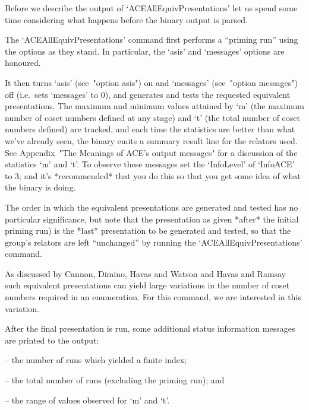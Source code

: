 Before we describe the {\GAP} output of `ACEAllEquivPresentations' let
us spend some time considering what happens before the  {\ACE}  binary
output is parsed.

The `ACEAllEquivPresentations'  command  first  performs  a  ``priming
run'' using the options as they stand. In particular, the  `asis'  and
`messages' options are honoured.

It  then  turns  `asis'  (see~"option   asis")   on   and   `messages'
(see~"option messages") off (i.e.~sets `messages' to 0), and generates
and tests the requested  equivalent  presentations.  The  maximum  and
minimum values attained by `m' (the maximum number  of  coset  numbers
defined at any stage) and `t'  (the  total  number  of  coset  numbers
defined) are tracked, and each time the  statistics  are  better  than
what we've already seen, the {\ACE} binary emits a summary result line
for the relators used. See  Appendix~"The  Meanings  of  ACE's  output
messages" for a discussion of the statistics `m' and `t'.  To  observe
these messages set  the  `InfoLevel'  of  `InfoACE'  to  3;  and  it's
*recommended* that you do this so that you get some idea of  what  the
{\ACE} binary is doing.

The order in which the  equivalent  presentations  are  generated  and
tested has no particular significance, but note that the  presentation
as given *after* the initial priming run) is the  *last*  presentation
to be generated and tested, so that  the  group's  relators  are  left
``unchanged'' by running the `ACEAllEquivPresentations' command.

As discussed by Cannon, Dimino, Havas  and  Watson  \cite{CDHW73}  and
Havas and Ramsay \cite{HR01} such equivalent presentations  can  yield
large variations in  the  number  of  coset  numbers  required  in  an
enumeration. For this command, we are interested in this variation.

After  the  final  presentation  is  run,   some   additional   status
information messages are printed to the {\ACE} output:

\beginlist%

\item{--}  the number of runs which yielded a finite index; 

\item{--}  the total number of runs (excluding the priming run); and 

\item{--}  the range of values observed for `m' and `t'.

